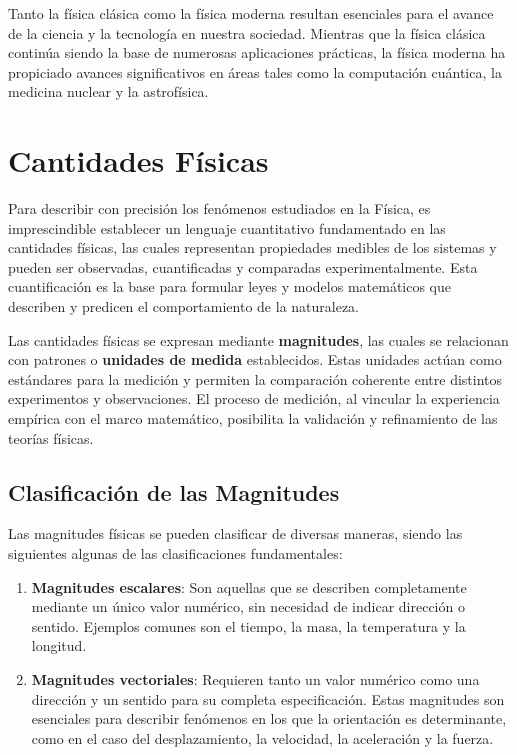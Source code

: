 Tanto la física clásica como la física moderna resultan esenciales para el avance de la ciencia y la tecnología en nuestra sociedad. Mientras que la física clásica continúa siendo la base de numerosas aplicaciones prácticas, la física moderna ha propiciado avances significativos en áreas tales como la computación cuántica, la medicina nuclear y la astrofísica.

\section{Cantidades Físicas}

Para describir con precisión los fenómenos estudiados en la Física, es imprescindible establecer un lenguaje cuantitativo fundamentado en las cantidades físicas, las cuales representan propiedades medibles de los sistemas y pueden ser observadas, cuantificadas y comparadas experimentalmente. Esta cuantificación es la base para formular leyes y modelos matemáticos que describen y predicen el comportamiento de la naturaleza.

Las cantidades físicas se expresan mediante \textbf{magnitudes}, las cuales se relacionan con patrones o \textbf{unidades de medida} establecidos. Estas unidades actúan como estándares para la medición y permiten la comparación coherente entre distintos experimentos y observaciones. El proceso de medición, al vincular la experiencia empírica con el marco matemático, posibilita la validación y refinamiento de las teorías físicas.

\subsection{Clasificación de las Magnitudes}

Las magnitudes físicas se pueden clasificar de diversas maneras, siendo las siguientes algunas de las clasificaciones fundamentales:

\begin{enumerate}
    \item \textbf{Magnitudes escalares}: Son aquellas que se describen completamente mediante un único valor numérico, sin necesidad de indicar dirección o sentido. Ejemplos comunes son el tiempo, la masa, la temperatura y la longitud.
    \item \textbf{Magnitudes vectoriales}: Requieren tanto un valor numérico como una dirección y un sentido para su completa especificación. Estas magnitudes son esenciales para describir fenómenos en los que la orientación es determinante, como en el caso del desplazamiento, la velocidad, la aceleración y la fuerza.
\end{enumerate}

